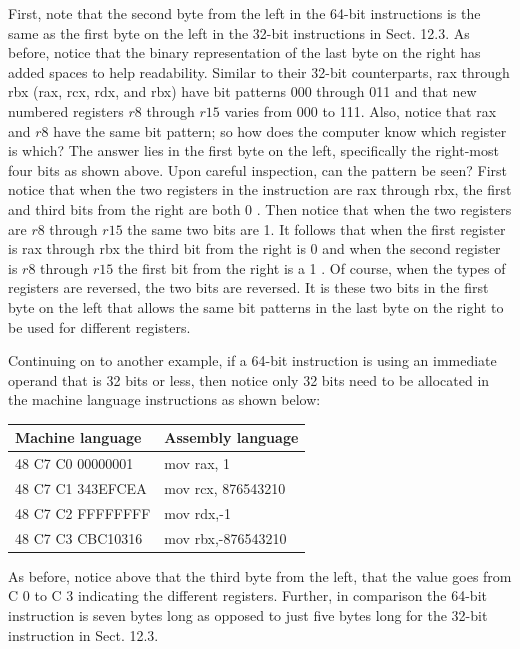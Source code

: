 \documentclass[10pt]{article}
\begin{document}
First, note that the second byte from the left in the 64-bit instructions is the same as the first byte on the left in the 32-bit instructions in Sect. 12.3. As before, notice that the binary representation of the last byte on the right has added spaces to help readability. Similar to their 32-bit counterparts, rax through rbx (rax, rcx, rdx, and rbx) have bit patterns 000 through 011 and that new numbered registers $r 8$ through $r 15$ varies from 000 to 111. Also, notice that rax and $r 8$ have the same bit pattern; so how does the computer know which register is which? The answer lies in the first byte on the left, specifically the right-most four bits as shown above. Upon careful inspection, can the pattern be seen? First notice that when the two registers in the instruction are rax through rbx, the first and third bits from the right are both 0 . Then notice that when the two registers are $r 8$ through $r 15$ the same two bits are 1. It follows that when the first register is rax through rbx the third bit from the right is 0 and when the second register is $r 8$ through $r 15$ the first bit from the right is a 1 . Of course, when the types of registers are reversed, the two bits are reversed. It is these two bits in the first byte on the left that allows the same bit patterns in the last byte on the right to be used for different registers.

Continuing on to another example, if a 64-bit instruction is using an immediate operand that is 32 bits or less, then notice only 32 bits need to be allocated in the machine language instructions as shown below:

\begin{center}
\begin{tabular}{|l|l|}
\hline
Machine language & Assembly language \\
\hline
48 C7 C0 00000001 & mov rax, 1 \\
\hline
48 C7 C1 343EFCEA & mov rcx, 876543210 \\
\hline
48 C7 C2 FFFFFFFF & mov rdx,-1 \\
\hline
48 C7 C3 CBC10316 & mov rbx,-876543210 \\
\hline
\end{tabular}
\end{center}

As before, notice above that the third byte from the left, that the value goes from C 0 to C 3 indicating the different registers. Further, in comparison the 64-bit instruction is seven bytes long as opposed to just five bytes long for the 32-bit instruction in Sect. 12.3.
\end{document}
